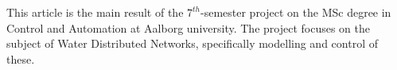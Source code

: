 This article is the main result of the $ 7^{th} $-semester project on the MSc degree in Control and Automation at Aalborg university. The project focuses on the subject of Water Distributed Networks, specifically modelling and control of these.  